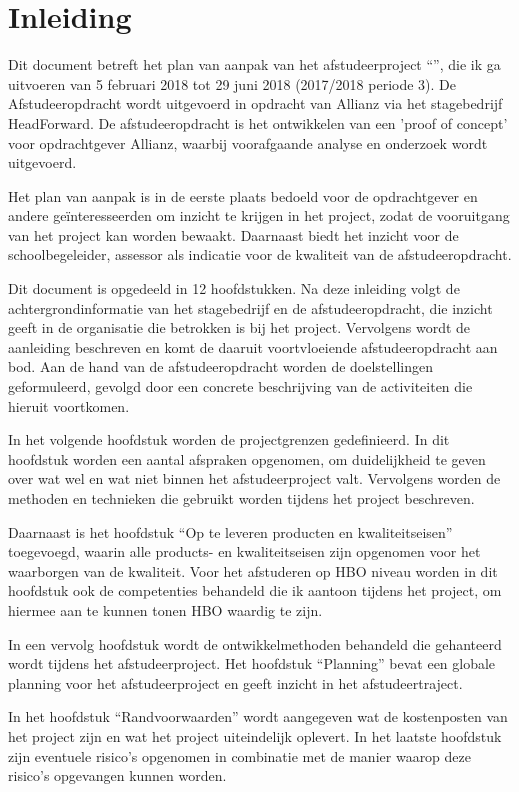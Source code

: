 \chapter{Inleiding}
Dit document betreft het plan van aanpak van het afstudeerproject ``\thesisTitle'', die ik ga uitvoeren van 5 februari 2018 tot 29 juni 2018 (2017/2018 periode 3). De Afstudeeropdracht wordt uitgevoerd in opdracht van Allianz via het stagebedrijf HeadForward. De afstudeeropdracht is het ontwikkelen van een 'proof of concept' voor opdrachtgever Allianz, waarbij voorafgaande analyse en onderzoek wordt uitgevoerd.\par

Het plan van aanpak is in de eerste plaats bedoeld voor de opdrachtgever en andere geïnteresseerden om inzicht te krijgen in het project, zodat de vooruitgang van het project kan worden bewaakt. Daarnaast biedt het inzicht voor de schoolbegeleider, assessor als indicatie voor de kwaliteit van de afstudeeropdracht.\par

Dit document is opgedeeld in 12 hoofdstukken. Na deze inleiding volgt de achtergrondinformatie van het stagebedrijf en de afstudeeropdracht, die inzicht geeft in de organisatie die betrokken is bij het project. Vervolgens wordt de aanleiding beschreven en komt de daaruit voortvloeiende afstudeeropdracht aan bod. Aan de hand van de afstudeeropdracht worden de doelstellingen geformuleerd, gevolgd door een concrete beschrijving van de activiteiten die hieruit voortkomen.\par

In het volgende hoofdstuk worden de projectgrenzen gedefinieerd. In dit hoofdstuk worden een aantal afspraken opgenomen, om duidelijkheid te geven over wat wel en wat niet binnen het afstudeerproject valt. Vervolgens worden de methoden en technieken die gebruikt worden tijdens het project beschreven.\par

Daarnaast is het hoofdstuk ``Op te leveren producten en kwaliteitseisen''  toegevoegd, waarin alle products- en kwaliteitseisen zijn opgenomen voor het waarborgen van de kwaliteit. Voor het afstuderen op HBO niveau worden in dit hoofdstuk ook de competenties behandeld die ik aantoon tijdens het project, om hiermee aan te kunnen tonen HBO waardig te zijn. \par

In een vervolg hoofdstuk wordt de ontwikkelmethoden behandeld die gehanteerd wordt tijdens het afstudeerproject. Het hoofdstuk ``Planning'' bevat een globale planning voor het afstudeerproject en geeft inzicht in het afstudeertraject.\par

In het hoofdstuk ``Randvoorwaarden'' wordt aangegeven wat de kostenposten van het project zijn en wat het project uiteindelijk oplevert. In het laatste hoofdstuk zijn eventuele risico's opgenomen in combinatie met de manier waarop deze risico's opgevangen kunnen worden.